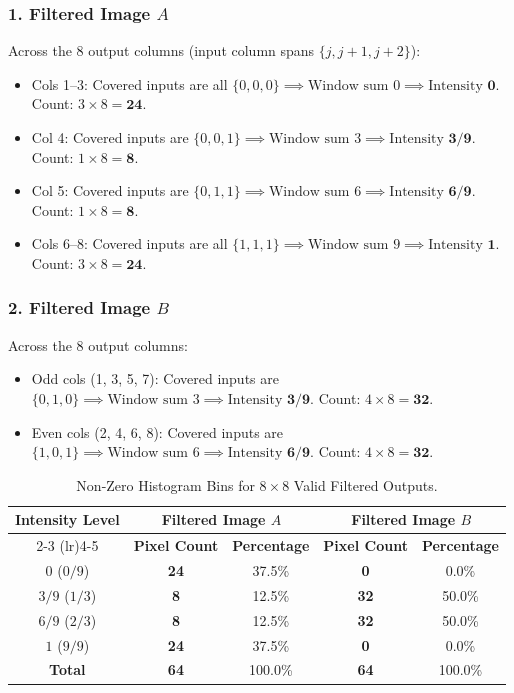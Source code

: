 \documentclass[11pt,a4paper]{article}
\begin{document}
\subsubsection{1. Filtered Image $A$}
Across the 8 output columns (input column spans $\{j, j+1, j+2\}$):
\begin{itemize}
    \item Cols 1--3: Covered inputs are all $\{0, 0, 0\} \implies \text{Window sum } 0 \implies \text{Intensity } \mathbf{0}$. Count: $3 \times 8 = \mathbf{24}$.
    \item Col 4: Covered inputs are $\{0, 0, 1\} \implies \text{Window sum } 3 \implies \text{Intensity } \mathbf{3/9}$. Count: $1 \times 8 = \mathbf{8}$.
    \item Col 5: Covered inputs are $\{0, 1, 1\} \implies \text{Window sum } 6 \implies \text{Intensity } \mathbf{6/9}$. Count: $1 \times 8 = \mathbf{8}$.
    \item Cols 6--8: Covered inputs are all $\{1, 1, 1\} \implies \text{Window sum } 9 \implies \text{Intensity } \mathbf{1}$. Count: $3 \times 8 = \mathbf{24}$.
\end{itemize}

\subsubsection{2. Filtered Image $B$}
Across the 8 output columns:
\begin{itemize}
    \item Odd cols (1, 3, 5, 7): Covered inputs are $\{0, 1, 0\} \implies \text{Window sum } 3 \implies \text{Intensity } \mathbf{3/9}$. Count: $4 \times 8 = \mathbf{32}$.
    \item Even cols (2, 4, 6, 8): Covered inputs are $\{1, 0, 1\} \implies \text{Window sum } 6 \implies \text{Intensity } \mathbf{6/9}$. Count: $4 \times 8 = \mathbf{32}$.
\end{itemize}

\begin{table}[htbp]
\centering
\caption{Non-Zero Histogram Bins for $8 \times 8$ Valid Filtered Outputs.}
\label{tab:p3_histograms}
\begin{tabular}{ccccc}
\toprule
\multirow{2}{*}{\textbf{Intensity Level}} & \multicolumn{2}{c}{\textbf{Filtered Image $A$}} & \multicolumn{2}{c}{\textbf{Filtered Image $B$}} \\
\cmidrule(lr){2-3} \cmidrule(lr){4-5}
& \textbf{Pixel Count} & \textbf{Percentage} & \textbf{Pixel Count} & \textbf{Percentage} \\
\midrule
$0$ ($0/9$)     & \textbf{24} & 37.5\% & \textbf{0}  & 0.0\%  \\
$3/9$ ($1/3$)   & \textbf{8}  & 12.5\% & \textbf{32} & 50.0\% \\
$6/9$ ($2/3$)   & \textbf{8}  & 12.5\% & \textbf{32} & 50.0\% \\
$1$ ($9/9$)     & \textbf{24} & 37.5\% & \textbf{0}  & 0.0\%  \\
\midrule
\textbf{Total}  & \textbf{64} & 100.0\% & \textbf{64} & 100.0\% \\
\bottomrule
\end{tabular}
\end{table}
\end{document}
